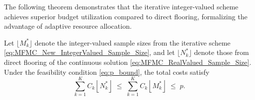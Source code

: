 The following theorem demonstrates that the iterative integer-valued scheme achieves superior budget utilization compared to direct flooring, formalizing the advantage of adaptive resource allocation.
%
\begin{theorem}
\label{thm:MFMC_New_IntegerValued_Cost} 
Let $\lfloor M_k^* \rfloor$ denote the integer-valued sample sizes from the iterative scheme \eqref{eq:MFMC_New_IntegerValued_Sample_Size}, and let $\lfloor N_k^* \rfloor$ denote those from direct flooring of the continuous solution \eqref{eq:MFMC_RealValued_Sample_Size}. Under the feasibility condition \eqref{eq:p_bound}, the total costs satisfy
\begin{equation}\label{eq:Iterative_integer_sample_size_cost_bound}
    \sum_{k=1}^K C_k \left\lfloor N_k^* \right\rfloor
    \;\le\;
    \sum_{k=1}^K C_k \left\lfloor M_k^* \right\rfloor
    \;\le\;
    p.
\end{equation}
\end{theorem}
%












